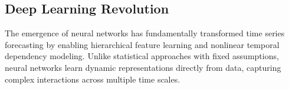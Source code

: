 \subsection{Deep Learning Revolution}
The emergence of neural networks has fundamentally transformed time series forecasting by enabling hierarchical feature learning and nonlinear temporal dependency modeling. Unlike statistical approaches with fixed assumptions, neural networks learn dynamic representations directly from data, capturing complex interactions across multiple time scales.




